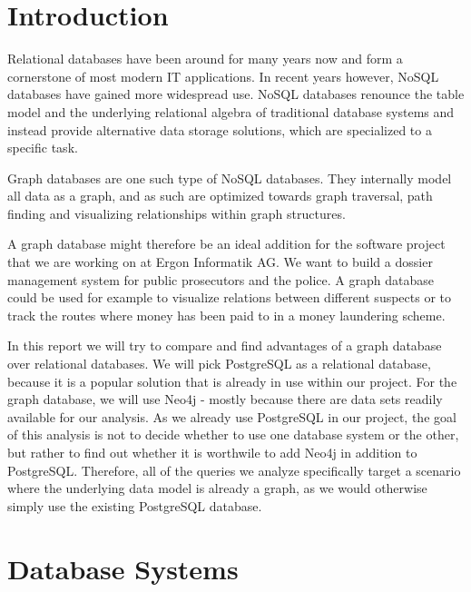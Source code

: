\documentclass[11pt, a4paper,oneside,chapterprefix=false]{scrbook}
\begin{document}
\tableofcontents

\mainmatter

\chapter{Introduction} \label{chp:introduction}

Relational databases have been around for many years now and form a cornerstone of most modern IT applications.
In recent years however, NoSQL databases have gained more widespread use.
NoSQL databases renounce the table model and the underlying relational algebra of traditional database systems and instead provide alternative data storage solutions, which are specialized to a specific task.

Graph databases are one such type of NoSQL databases.
They internally model all data as a graph, and as such are optimized towards graph traversal, path finding and visualizing relationships within graph structures.

A graph database might therefore be an ideal addition for the software project that we are working on at Ergon Informatik AG.
We want to build a dossier management system for public prosecutors and the police.
A graph database could be used for example to visualize relations between different suspects or to track the routes where money has been paid to in a money laundering scheme.

In this report we will try to compare and find advantages of a graph database over relational databases.
We will pick PostgreSQL as a relational database, because it is a popular solution that is already in use within our project.
For the graph database, we will use Neo4j - mostly because there are data sets readily available for our analysis.
As we already use PostgreSQL in our project, the goal of this analysis is not to decide whether to use one database system or the other, but rather to find out whether it is worthwile to add Neo4j in addition to PostgreSQL.
Therefore, all of the queries we analyze specifically target a scenario where the underlying data model is already a graph, as we would otherwise simply use the existing PostgreSQL database.

\chapter{Database Systems} \label{chp:theory}
\end{document}
